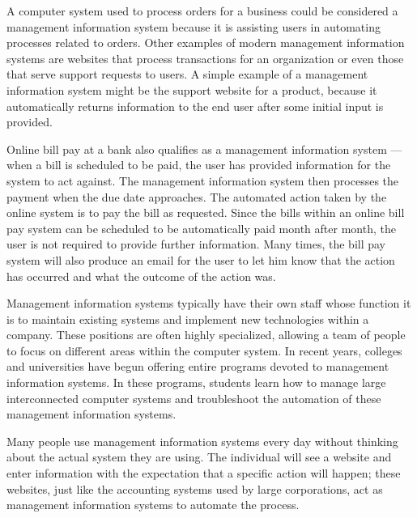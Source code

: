 A computer system used to process orders for a business could be considered a management information system because it is assisting users in automating processes related to orders. Other examples of modern management information systems are websites that process transactions for an organization or even those that serve support requests to users. A simple example of a management information system might be the support website for a product, because it automatically returns information to the end user after some initial input is provided.

Online bill pay at a bank also qualifies as a management information system — when a bill is scheduled to be paid, the user has provided information for the system to act against. The management information system then processes the payment when the due date approaches. The automated action taken by the online system is to pay the bill as requested. Since the bills within an online bill pay system can be scheduled to be automatically paid month after month, the user is not required to provide further information. Many times, the bill pay system will also produce an email for the user to let him know that the action has occurred and what the outcome of the action was.

Management information systems typically have their own staff whose function it is to maintain existing systems and implement new technologies within a company. These positions are often highly specialized, allowing a team of people to focus on different areas within the computer system. In recent years, colleges and universities have begun offering entire programs devoted to management information systems. In these programs, students learn how to manage large interconnected computer systems and troubleshoot the automation of these management information systems.

Many people use management information systems every day without thinking about the actual system they are using. The individual will see a website and enter information with the expectation that a specific action will happen; these websites, just like the accounting systems used by large corporations, act as management information systems to automate the process.

